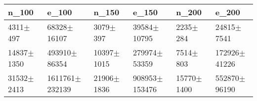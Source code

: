 \begin{tabular}{llllll}
\toprule
n_100 & e_100 & n_150 & e_150 & n_200 & e_200 \\
\midrule
4311$\pm$497 & 68328$\pm$16107 & 3079$\pm$397 & 39584$\pm$10795 & 2235$\pm$284 & 24815$\pm$7541 \\
14837$\pm$1350 & 493910$\pm$86354 & 10397$\pm$1015 & 279974$\pm$53359 & 7514$\pm$803 & 172926$\pm$41226 \\
31532$\pm$2413 & 1611761$\pm$232139 & 21906$\pm$1836 & 908953$\pm$153476 & 15770$\pm$1400 & 552870$\pm$96190 \\
\bottomrule
\end{tabular}
